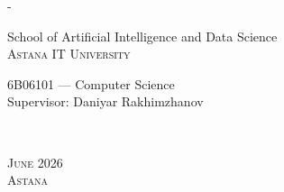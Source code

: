 \begin{titlingpage}
\begin{SingleSpace}
\begin{adjustwidth*}{\unitlength}{-\unitlength}
\begin{center}
\vspace{6mm}

{\large School of Artificial Intelligence and Data Science\\
\textsc{Astana IT University}}\\

\vspace{30mm}

\begin{minipage}{8cm}
\centering
6B06101 --- Computer Science\\
Supervisor: Daniyar Rakhimzhanov
\end{minipage}\\

\vspace{20mm}

{\large\textsc{June 2026}}\\
{\large\textsc{Astana}}

\vspace{12mm}

\end{center}

\end{adjustwidth*}
\end{SingleSpace}
\end{titlingpage}